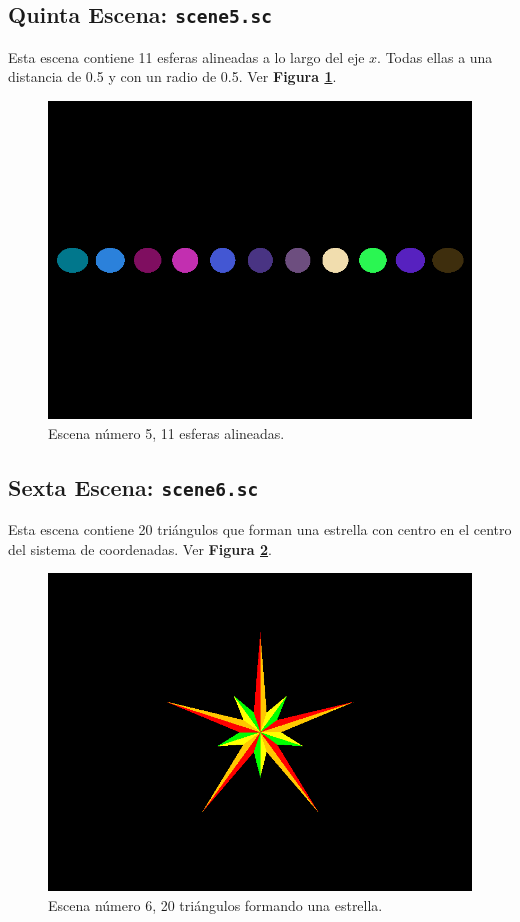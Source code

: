 \documentclass[a4paper,10pt]{article}
\begin{document}
\subsection{Quinta Escena: \texttt{scene5.sc}}
Esta escena contiene 11 esferas alineadas a lo largo del eje $x$.  Todas ellas a una distancia de 0.5 y con un radio de 0.5. Ver \textbf{Figura \ref{fig:5}}.

\begin{figure}[h]
 \centering
 \includegraphics[width=320pt,keepaspectratio=true]{../scene5.png}
 \caption{Escena n\'umero 5, 11 esferas alineadas.}
 \label{fig:5}
\end{figure}

\subsection{Sexta Escena: \texttt{scene6.sc}}
Esta escena contiene 20 tri\'angulos que forman una estrella con centro en el centro del sistema de coordenadas.  Ver \textbf{Figura \ref{fig:6}}.

\begin{figure}[h]
 \centering
 \includegraphics[width=320pt,keepaspectratio=true]{../scene6.png}
 \caption{Escena n\'umero 6, 20 tri\'angulos formando una estrella.}
 \label{fig:6}
\end{figure}
\end{document}
